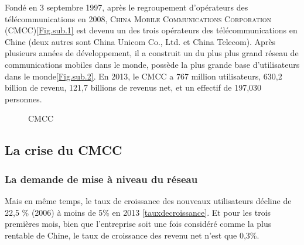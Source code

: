 Fondé en 3 septembre 1997, après le regroupement d'opérateurs des télécommunications en 2008, \textsc{China Mobile Communications Corporation} (\textsf{CMCC})\ref{Fig.sub.1} est devenu un des trois opérateurs des télécommunications en Chine (deux autres sont \textsf{China Unicom Co., Ltd.} et \textsf{China Telecom}). Après plusieurs années de développement, il a construit un du plus plus grand réseau de communications mobiles dans le monde, possède la plus grande base d'utilisateurs dans le monde\ref{Fig.sub.2}. En 2013, le CMCC a 767 million utilisateurs, 630,2 billion \textyen   \hspace{0.5ex} de revenu, 121,7 billions \textyen \hspace{0.5ex} de revenus net, et un effectif de 197,030 personnes.
\begin{figure}[H]
	\flushleft
	\hfill
	\hspace{1in}
	\caption{CMCC} 
\end{figure}

\subsection{La crise du CMCC}
\subsubsection{La demande de mise à niveau du réseau}
Mais en même temps, le taux de croissance des nouveaux utilisateurs décline de 22,5 \% (2006) à moins de 5\% en 2013 \ref{tauxdecroissance}. Et pour les trois premières mois, bien que l'entreprise soit une fois considéré comme la plus rentable de Chine, le taux de croissance des revenu net n'est que 0,3\%.

